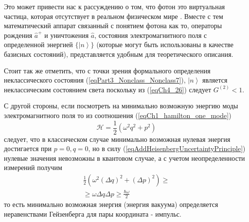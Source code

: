 \begin{remark}
  Это может привести нас к рассуждению о том, что фотон это
  виртуальная частица, которая отсутствует в реальном физическом мире
  \cite{Lamb1995}. Вместе с тем математический аппарат связанный с
  понятием фотона как то, операторы рождения $\hat{a}^{+}$ и
  уничтожения $\hat{a}$, состояния электромагнитного поля с
  определенной энергией $\{\left|n\right>\}$ (которые могут быть
  использованы в качестве базисных состояний), представляется удобным
  для теоретического описания.

  Стоит так же отметить, что с точки зрения формального определения
  неклассического состояния (\ref{eqPart3_Nonclass_Nonclass7}),
  $\left|n\right>$ является неклассическим 
  состоянием света поскольку из (\ref{eqCh4_26}) следует $G^{(2)} <
  1$.

  С другой стороны, если посмотреть на минимально возможную энергию
  моды электромагнитного поля то из соотношения
  (\ref{eqCh1_hamilton_one_mode}) 
  \[
  \mathcal{H} = \frac{1}{2}\left(\omega^2 q^2 + p^2\right)
  \]
  следует, что в классическом случае минимально возможная нулевая
  энергия достигается при $p = 0, q=0$, но в силу
  (\ref{eqAddHeisenbergUncertaintyPrinciple}) нулевые значения
  невозможны в квантовом случае, а с учетом неопределенности измерений
  получим 
  \begin{eqnarray}
    \frac{1}{2}\left(\omega^2 (\Delta q)^2 + (\Delta p)^2\right) \ge
    \nonumber \\
    \ge \omega \Delta q \Delta p \ge \frac{\hbar \omega}{2}
    \nonumber
  \end{eqnarray}
  то есть минимально возможная энергия (энергия вакуума) определяется
  неравенствами Гейзенберга для пары координата - импульс.  
  \label{rem:antiphoton}
\end{remark}

